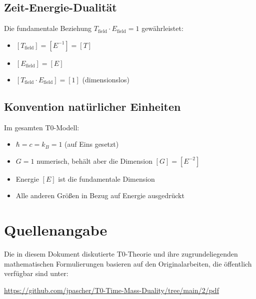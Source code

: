 \documentclass[12pt,a4paper]{report}
\begin{document}
	\subsection{Zeit-Energie-Dualität}
	Die fundamentale Beziehung $T_{\text{field}} \cdot E_{\text{field}} = 1$ gewährleistet:
	\begin{itemize}
		\item $[T_{\text{field}}] = [E^{-1}] = [T]$
		\item $[E_{\text{field}}] = [E]$
		\item $[T_{\text{field}} \cdot E_{\text{field}}] = [1]$ (dimensionslos)
	\end{itemize}
	
	\subsection{Konvention natürlicher Einheiten}
	Im gesamten T0-Modell:
	\begin{itemize}
		\item $\hbar = c = k_B = 1$ (auf Eins gesetzt)
		\item $G = 1$ numerisch, behält aber die Dimension $[G] = [E^{-2}]$
		\item Energie $[E]$ ist die fundamentale Dimension
		\item Alle anderen Größen in Bezug auf Energie ausgedrückt
	\end{itemize}
	\section{Quellenangabe}
	
	Die in diesem Dokument diskutierte T0-Theorie und ihre zugrundeliegenden mathematischen Formulierungen basieren auf den Originalarbeiten, die öffentlich verfügbar sind unter:
	
	
	\begin{center}
		\url{https://github.com/jpascher/T0-Time-Mass-Duality/tree/main/2/pdf}
	\end{center}
	
	
\end{document}
